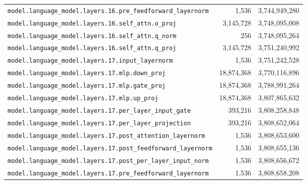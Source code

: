 \documentclass[10pt,a4paper]{article}
\theoremstyle{definition}
\begin{document}
\begin{appendices}
\begin{longtable}{p{9.5cm}rr}
\texttt{model.\allowbreak{}language\_model.\allowbreak{}layers.\allowbreak{}16.\allowbreak{}pre\_feedforward\_layernorm} & 1,536 & 3,744,949,280 \\
\texttt{model.\allowbreak{}language\_model.\allowbreak{}layers.\allowbreak{}16.\allowbreak{}self\_attn.\allowbreak{}o\_proj} & 3,145,728 & 3,748,095,008 \\
\texttt{model.\allowbreak{}language\_model.\allowbreak{}layers.\allowbreak{}16.\allowbreak{}self\_attn.\allowbreak{}q\_norm} & 256 & 3,748,095,264 \\
\texttt{model.\allowbreak{}language\_model.\allowbreak{}layers.\allowbreak{}16.\allowbreak{}self\_attn.\allowbreak{}q\_proj} & 3,145,728 & 3,751,240,992 \\
\texttt{model.\allowbreak{}language\_model.\allowbreak{}layers.\allowbreak{}17.\allowbreak{}input\_layernorm} & 1,536 & 3,751,242,528 \\
\texttt{model.\allowbreak{}language\_model.\allowbreak{}layers.\allowbreak{}17.\allowbreak{}mlp.\allowbreak{}down\_proj} & 18,874,368 & 3,770,116,896 \\
\texttt{model.\allowbreak{}language\_model.\allowbreak{}layers.\allowbreak{}17.\allowbreak{}mlp.\allowbreak{}gate\_proj} & 18,874,368 & 3,788,991,264 \\
\texttt{model.\allowbreak{}language\_model.\allowbreak{}layers.\allowbreak{}17.\allowbreak{}mlp.\allowbreak{}up\_proj} & 18,874,368 & 3,807,865,632 \\
\texttt{model.\allowbreak{}language\_model.\allowbreak{}layers.\allowbreak{}17.\allowbreak{}per\_layer\_input\_gate} & 393,216 & 3,808,258,848 \\
\texttt{model.\allowbreak{}language\_model.\allowbreak{}layers.\allowbreak{}17.\allowbreak{}per\_layer\_projection} & 393,216 & 3,808,652,064 \\
\texttt{model.\allowbreak{}language\_model.\allowbreak{}layers.\allowbreak{}17.\allowbreak{}post\_attention\_layernorm} & 1,536 & 3,808,653,600 \\
\texttt{model.\allowbreak{}language\_model.\allowbreak{}layers.\allowbreak{}17.\allowbreak{}post\_feedforward\_layernorm} & 1,536 & 3,808,655,136 \\
\texttt{model.\allowbreak{}language\_model.\allowbreak{}layers.\allowbreak{}17.\allowbreak{}post\_per\_layer\_input\_norm} & 1,536 & 3,808,656,672 \\
\texttt{model.\allowbreak{}language\_model.\allowbreak{}layers.\allowbreak{}17.\allowbreak{}pre\_feedforward\_layernorm} & 1,536 & 3,808,658,208 \\

\end{longtable}
\end{appendices}
\end{document}
